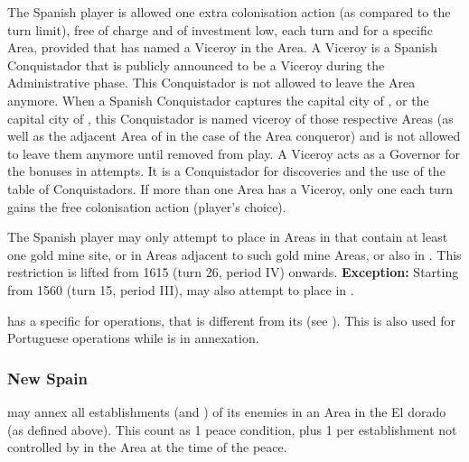 \aparag[Viceroys] The Spanish player is allowed one extra colonisation
action (as compared to the turn limit), free of charge and of investment
low, each turn and for a specific Area, provided that \SPA has named a
Viceroy in the Area.
\bparag A Viceroy is a Spanish Conquistador that is publicly announced
to be a Viceroy during the Administrative phase. This Conquistador is
not allowed to leave the Area anymore.
\bparag When a Spanish Conquistador captures the  capital
city of , or the  capital city of
, this Conquistador is named viceroy of those respective
Areas (as well as the adjacent Area of  in the
case of the  Area conqueror) and is not allowed to leave
them anymore until removed from play.
\bparag A Viceroy acts as a Governor for the bonuses in \COL
attempts. It is a Conquistador for discoveries and the use of the table
of Conquistadors.
\bparag If more than one Area has a Viceroy, only one each turn gains
the free colonisation action (player's choice).

\aparag[El Dorado] The Spanish player may only attempt to place \COL in
Areas in  that contain at least one gold mine site,
or in Areas adjacent to such gold mine Areas, or also in
.
\bparag This restriction is lifted from 1615 (turn 26, period IV)
onwards.
\bparag \textbf{Exception:} Starting from 1560 (turn 15, period III),
\HIS may also attempt to place \COL in \granderegionPhilippines.

 \SPA has a specific \FTI for \COL
operations, that is different from its \FTI (see
).
\bparag This \FTI is also used for Portuguese \COL operations while
 is in annexation.

\subsubsection{New Spain}
\aparag \HIS may annex all establishments (\COL and \TP) of its enemies
in an Area in the El dorado (as defined above).
\bparag This count as 1 peace condition, plus 1 per establishment not
controlled by \SPA in the Area at the time of the peace.

